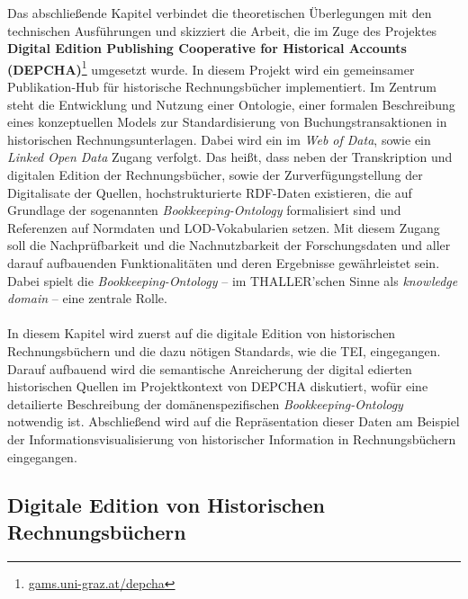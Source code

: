 \documentclass[12pt,a4paper]{article}
\begin{document}
Das abschließende Kapitel verbindet die theoretischen Überlegungen mit den technischen Ausführungen und skizziert die Arbeit, die im Zuge des Projektes \textbf{Digital Edition Publishing Cooperative for Historical Accounts (DEPCHA)}\footnote{\url{gams.uni-graz.at/depcha}} umgesetzt wurde. In diesem Projekt wird ein gemeinsamer Publikation-Hub für historische Rechnungsbücher implementiert. Im Zentrum steht die Entwicklung und Nutzung einer Ontologie, einer formalen Beschreibung eines konzeptuellen Models zur Standardisierung von Buchungstransaktionen in historischen Rechnungsunterlagen. Dabei wird ein im \textit{Web of Data}, sowie ein \textit{Linked Open Data} Zugang verfolgt. Das heißt, dass neben der Transkription und digitalen Edition der Rechnungsbücher, sowie der Zurverfügungstellung der Digitalisate der Quellen, hochstrukturierte RDF-Daten existieren, die auf Grundlage der sogenannten \textit{Bookkeeping-Ontology} formalisiert sind und Referenzen auf Normdaten und LOD-Vokabularien setzen. Mit diesem Zugang soll die Nachprüfbarkeit und die Nachnutzbarkeit der Forschungsdaten und aller darauf aufbauenden Funktionalitäten und deren Ergebnisse gewährleistet sein. Dabei spielt die \textit{Bookkeeping-Ontology} -- im THALLER'schen Sinne als \textit{knowledge domain} -- eine zentrale Rolle.
\\
\\
In diesem Kapitel wird zuerst auf die digitale Edition von historischen Rechnungsbüchern und die dazu nötigen Standards, wie die TEI, eingegangen. Darauf aufbauend wird die semantische Anreicherung der digital edierten historischen Quellen im Projektkontext von DEPCHA diskutiert, wofür eine detailierte Beschreibung der domänenspezifischen \textit{Bookkeeping-Ontology} notwendig ist. Abschließend wird auf die Repräsentation dieser Daten am Beispiel der Informationsvisualisierung von historischer Information in Rechnungsbüchern eingegangen.

\subsection{Digitale Edition von Historischen Rechnungsbüchern}
\end{document}

